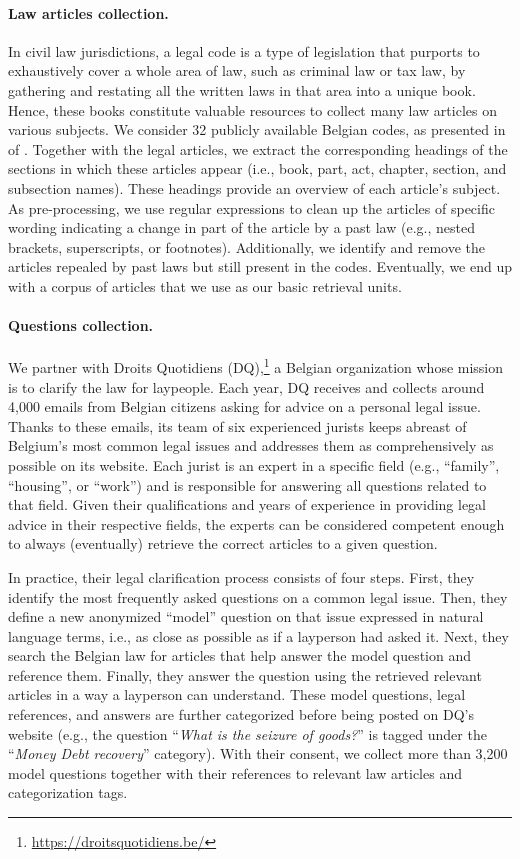 \documentclass[11pt]{article}
\begin{document}
\paragraph{Law articles collection.}
In civil law jurisdictions, a legal code is a type of legislation that purports to exhaustively cover a whole area of law, such as criminal law or tax law, by gathering and restating all the written laws in that area into a unique book. Hence, these books constitute valuable resources to collect many law articles on various subjects. We consider 32 publicly available Belgian codes, as presented in  of . Together with the legal articles, we extract the corresponding headings of the sections in which these articles appear (i.e., book, part, act, chapter, section, and subsection names). These headings provide an overview of each article’s subject. As pre-processing, we use regular expressions to clean up the articles of specific wording indicating a change in part of the article by a past law (e.g., nested brackets, superscripts, or footnotes). Additionally, we identify and remove the articles repealed by past laws but still present in the codes. Eventually, we end up with a corpus  of  articles that we use as our basic retrieval units.

\paragraph{Questions collection.}
We partner with Droits Quotidiens (DQ),\footnote{\url{https://droitsquotidiens.be/}} a Belgian organization whose mission is to clarify the law for laypeople. Each year, DQ receives and collects around 4,000 emails from Belgian citizens asking for advice on a personal legal issue. Thanks to these emails, its team of six experienced jurists keeps abreast of Belgium’s most common legal issues and addresses them as comprehensively as possible on its website. Each jurist is an expert in a specific field (e.g., “family”, “housing”, or “work”) and is responsible for answering all questions related to that field. Given their qualifications and years of experience in providing legal advice in their respective fields, the experts can be considered competent enough to always (eventually) retrieve the correct articles to a given question. 

In practice, their legal clarification process consists of four steps. First, they identify the most frequently asked questions on a common legal issue. Then, they define a new anonymized “model” question on that issue expressed in natural language terms, i.e., as close as possible as if a layperson had asked it. Next, they search the Belgian law for articles that help answer the model question and reference them. Finally, they answer the question using the retrieved relevant articles in a way a layperson can understand. These model questions, legal references, and answers are further categorized before being posted on DQ’s website (e.g., the question “\textsl{What is the seizure of goods?}” is tagged under the “\textsl{Money  Debt recovery}” category). With their consent, we collect more than 3,200 model questions together with their references to relevant law articles and categorization tags. 
\end{document}
